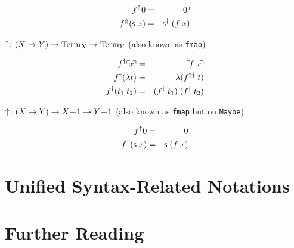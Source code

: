 \begin{eqnarray*}
  f^\Uparrow 0 & = & \ulcorner\! 0 \!\urcorner \\
  f^\Uparrow (\mathsf{s} \; x) & = & \mathsf{s}^\dagger\;(f\;x) \\
\end{eqnarray*}

$^\dagger \colon (X \to Y) \to \mathrm{Term}_{X} \to \mathrm{Term}_{Y}$ (also known as \texttt{fmap})

\begin{eqnarray*}
  f^\dagger\ulcorner\! x \!\urcorner   & = & \ulcorner\! f\;x \!\urcorner \\
  f^\dagger(\lambda t) & = & \lambda(f^{\uparrow\dagger}\;t) \\
  f^\dagger(t_1\;t_2)  & = & (f^\dagger\;t_1)\;(f^\dagger\;t_2)
\end{eqnarray*}

$\uparrow \colon (X \to Y) \to X\!+\!1 \to Y\!+\!1$
  (also known as \texttt{fmap} but on \texttt{Maybe})

\begin{eqnarray*}
  f^\uparrow 0            & = & 0 \\
  f^\uparrow (\mathsf{s}\;x) & = & \mathsf{s}\;(f \; x)
\end{eqnarray*}

\section{Unified Syntax-Related Notations}

\section{Further Reading}
